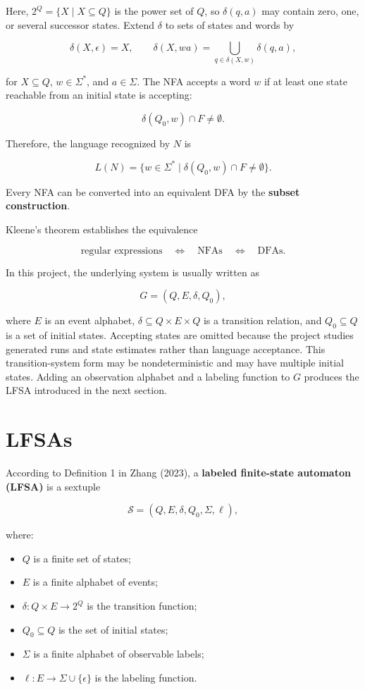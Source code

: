 \documentclass[11pt]{article}
\begin{document}
Here, $2^Q=\{X\mid X\subseteq Q\}$ is the power set of $Q$, so $\delta(q,a)$ may contain zero, one, or several successor states. Extend $\delta$ to sets of states and words by

\[
\delta(X,\epsilon)=X,\qquad
\delta(X,wa)=\bigcup_{q\in\delta(X,w)}\delta(q,a),
\]

for $X\subseteq Q$, $w\in\Sigma^*$, and $a\in\Sigma$. The NFA accepts a word $w$ if at least one state reachable from an initial state is accepting:

\[
\delta(Q_0,w)\cap F\neq\emptyset.
\]

Therefore, the language recognized by $N$ is

\[
L(N)=\{w\in\Sigma^*\mid\delta(Q_0,w)\cap F\neq\emptyset\}.
\]

Every NFA can be converted into an equivalent DFA by the \textbf{subset construction}. 

Kleene's theorem establishes the equivalence

\[
\text{regular expressions}
\quad\Longleftrightarrow\quad
\text{NFAs}
\quad\Longleftrightarrow\quad
\text{DFAs}.
\]

In this project, the underlying system is usually written as

\[
G=(Q,E,\delta,Q_0),
\]

\noindent
where $E$ is an event alphabet, $\delta\subseteq Q\times E\times Q$ is a transition relation, and $Q_0\subseteq Q$ is a set of initial states. Accepting states are omitted because the project studies generated runs and state estimates rather than language acceptance. This transition-system form may be nondeterministic and may have multiple initial states. Adding an observation alphabet and a labeling function to $G$ produces the LFSA introduced in the next section.

\section{LFSAs}


According to Definition 1 in Zhang (2023), a \textbf{labeled finite-state automaton (LFSA)} is a sextuple

\[
\mathcal{S}=(Q,E,\delta,Q_0,\Sigma,\ell),
\]

where:

\begin{itemize}
\item $Q$ is a finite set of states;
\item $E$ is a finite alphabet of events;
\item $\delta:Q\times E\rightarrow 2^Q$ is the transition function;
\item $Q_0\subseteq Q$ is the set of initial states;
\item $\Sigma$ is a finite alphabet of observable labels;
\item $\ell:E\rightarrow\Sigma\cup\{\epsilon\}$ is the labeling function.

\end{itemize}
\end{document}
